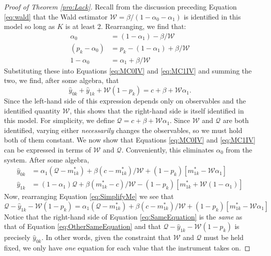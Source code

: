 \begin{proof}[Proof of Theorem \ref{pro:Lack}]
  Recall from the discussion preceding Equation \ref{eq:wald} that the Wald estimator $\mathcal{W} = \beta/(1-\alpha_0-\alpha_1)$ is identified in this model so long as $K$ is at least 2. 
  Rearranging, we find that:
  \begin{align*}
    \alpha_0 &= (1-\alpha_1) - \beta/\mathcal{W} \\
    (p_k - \alpha_0) &= p_k - (1-\alpha_1) + \beta/\mathcal{W}\\
    1 - \alpha_0 &= \alpha_1 + \beta/\mathcal{W}
  \end{align*}
Substituting these into Equations \ref{eq:MC0IV} and \ref{eq:MC1IV} and summing the two, we find, after some algebra, that
\[\hat{y}_{0k} + \hat{y}_{1k} + \mathcal{W}(1-p_k) = c + \beta + \mathcal{W} \alpha_1.\]
Since the left-hand side of this expression depends only on observables and the identified quantity $\mathcal{W}$, this shows that the right-hand side is itself identified in this model.
For simplicity, we define $\mathcal{Q} = c + \beta + \mathcal{W}\alpha_1$.
Since $\mathcal{W}$ and $\mathcal{Q}$ are both identified, varying either \emph{necessarily} changes the observables, so we must hold both of them constant. 
We now show that Equations \ref{eq:MC0IV} and \ref{eq:MC1IV} can be expressed in terms of $\mathcal{W}$ and $\mathcal{Q}$.
Conveniently, this eliminates $\alpha_0$ from the system.
After some algebra, 
\begin{align}
  \label{eq:OtherSameEquation}
  \hat{y}_{0k} &= \alpha_1 (\mathcal{Q} - m^*_{1k}) + \beta(c-m^*_{1k})/\mathcal{W} + (1-p_k)\left[m^*_{1k} - \mathcal{W}\alpha_1\right]\\
  \hat{y}_{1k} &= (1-\alpha_1) \mathcal{Q} + \beta(m^*_{1k} - c)/\mathcal{W} - (1-p_k)\left[m^*_{1k} + \mathcal{W}(1-\alpha_1)\right]
  \label{eq:SimplifyMe}
\end{align}
Now, rearranging Equation \ref{eq:SimplifyMe} we see that
\begin{equation}
  \mathcal{Q} - \hat{y}_{1k} - \mathcal{W}(1-p_k) = \alpha_1 (\mathcal{Q} - m^*_{1k}) + \beta(c-m^*_{1k})/\mathcal{W} + (1-p_k)\left[m^*_{1k} - \mathcal{W}\alpha_1\right]
  \label{eq:SameEquation}
\end{equation}
Notice that the right-hand side of Equation \ref{eq:SameEquation} is the \emph{same} as that of Equation \ref{eq:OtherSameEquation} and that $\mathcal{Q} - \hat{y}_{1k} - \mathcal{W}(1-p_k)$ is precisely $\hat{y}_{0k}$.
In other words, given the constraint that $\mathcal{W}$ and $\mathcal{Q}$ must be held fixed, we only have \emph{one} equation for each value that the instrument takes on.

\end{proof}
